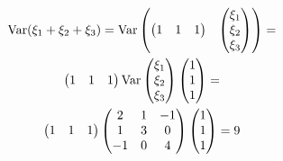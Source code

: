 \begin{problem}
\begin{sol}
\begin{multline*}
\operatorname{Var} (\xi_1 + \xi_2 + \xi_3)  = \operatorname{Var}   \begin{pmatrix}
 \begin{pmatrix}
1 & 1 & 1 \\
\end{pmatrix}  &  \begin{pmatrix}
\xi_1 \\
\xi_2 \\
\xi_3 \\
\end{pmatrix}
\end{pmatrix}  = \\
\begin{pmatrix}
1 & 1 & 1 \\
\end{pmatrix}  \operatorname{Var}   \begin{pmatrix}
\xi_1 \\
\xi_2 \\
\xi_3 \\
\end{pmatrix}   \begin{pmatrix}
1 \\
1 \\
1 \\
\end{pmatrix}  = \\
 \begin{pmatrix}
1 & 1 & 1 \\
\end{pmatrix}   \begin{pmatrix}
2 & 1 & -1 \\
1 & 3 & 0 \\
-1 & 0 & 4 \\
\end{pmatrix}   \begin{pmatrix}
1 \\
1 \\
1 \\
\end{pmatrix}  = 9
\end{multline*}
\end{sol}
\end{problem}





